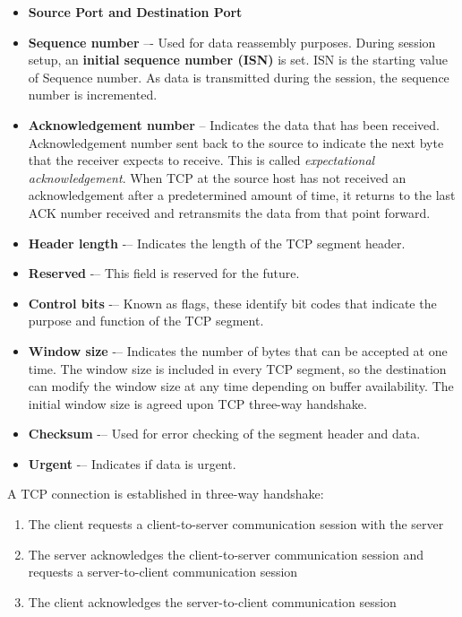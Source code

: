 {\begin{itemize}
\item \textbf{Source Port and Destination Port}

\item \textbf{Sequence number} –- Used for data reassembly purposes. During session setup, an \textbf{initial sequence number (ISN)} is set. ISN is the starting value of Sequence number. As data is transmitted during the session, the sequence number is incremented. 

\item \textbf{Acknowledgement number} – Indicates the data that has been received. Acknowledgement number sent back to the source to indicate the next byte that the receiver expects to receive. This is called \emph{expectational acknowledgement}. When TCP at the source host has not received an acknowledgement after a predetermined amount of time, it returns to the last ACK number received and retransmits the data from that point forward. 

\item \textbf{Header length} -– Indicates the length of the TCP segment header.
\item \textbf{Reserved} -– This field is reserved for the future.
\item \textbf{Control bits} -– Known as flags, these identify bit codes that indicate the purpose and function of the TCP segment.
\item \textbf{Window size} -– Indicates the number of bytes that can be accepted at one time. The window size is included in every TCP segment, so the destination can modify the window size at any time depending on buffer availability. The initial window size is agreed upon  TCP three-way handshake. 
\item \textbf{Checksum} -– Used for error checking of the segment header and data.
\item \textbf{Urgent} -– Indicates if data is urgent.
\end{itemize}

A TCP connection is established in three-way handshake:

\begin{enumerate}
\item The client requests a client-to-server communication session with the server
\item The server acknowledges the client-to-server communication session and requests a server-to-client communication session
\item The client acknowledges the server-to-client communication session 
\end{enumerate}

}
